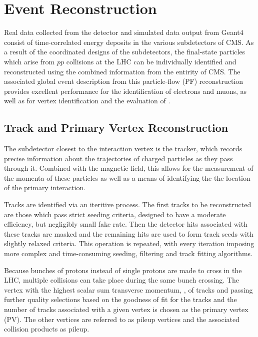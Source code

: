 
\chapter{Event Reconstruction}\label{sec:reconstruction}

 Real data collected from the detector
  and simulated data output from Geant4
  consist of time-correlated energy deposits
  in the various subdetectors of CMS.
 As a result of the coordinated designs 
  of the subdetectors, the final-state 
  particles which arise from $pp$ collisions 
  at the LHC can be individually identified
  and reconstructed using the combined
  information from the entirity of CMS.
 The associated global event description
  from this particle-flow (PF) reconstruction
  provides excellent performance for
  the identification of electrons and muons,
  as well as for vertex identification
  and the evaluation of \met.
 
\section{Track and Primary Vertex Reconstruction}\label{sec:vertexreco}
 The subdetector closest to the interaction vertex
  is the tracker, which records precise
  information about the trajectories of 
  charged particles as they pass through it.
 Combined with the magnetic field, 
  this allows for the measurement of the
  momenta of these particles as well as a
  means of identifying the the location of
  the primary interaction.

 Tracks are identified via an iteritive process. 
 The first tracks to be reconstructed
  are those which pass strict seeding
  criteria, designed to have a moderate
  efficiency, but negligibly small
  fake rate.
 Then the detector hits associated
  with these tracks are masked
  and the remaining hits are used to
  form track seeds with slightly relaxed
  criteria.
 This operation is repeated, with every
  iteration imposing more complex and time-consuming
  seeding, filtering and track fitting algorithms.
 
 Because bunches of protons instead of single protons
  are made to cross in the LHC, 
  multiple collisions can take place during the same
  bunch crossing.
 The vertex with the highest scalar sum
  transverse momentum, \pt,
  of tracks and passing further quality selections
  based on the goodness of fit for the tracks
  and the number of tracks associated with a given vertex
  is chosen as the primary vertex (PV).
 The other vertices are referred to as
  pileup vertices and the associated collision
  products as pileup.

